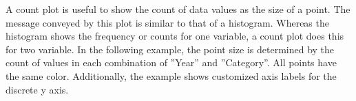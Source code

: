 





A count plot is useful to show the count of data values as the size of a point. The message conveyed by this plot is similar to that of a histogram. Whereas the histogram shows the frequency or counts for one variable, a count plot does this for two variable. In the following example, the point size is determined by the count of values in each combination of ''Year'' and ''Category''. All points have the same color. Additionally, the example shows customized axis labels for the discrete y axis. 


